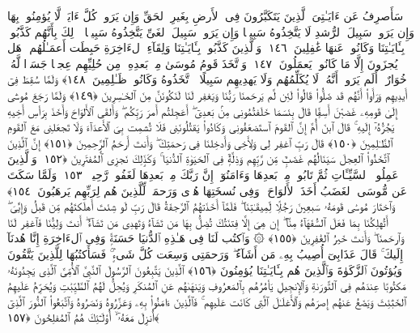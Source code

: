  سَأَصرِفُ عَن ءَايَـٰتِىَ ٱلَّذِينَ يَتَكَبَّرُونَ فِى ٱلأَرضِ بِغَيرِ ٱلحَقِّ وَإِن يَرَوا۟ كُلَّ ءَايَةٍۢ لَّا يُؤمِنُوا۟ بِهَا وَإِن يَرَوا۟ سَبِيلَ ٱلرُّشدِ لَا يَتَّخِذُوهُ سَبِيلًۭا وَإِن يَرَوا۟ سَبِيلَ ٱلغَىِّ يَتَّخِذُوهُ سَبِيلًۭا ۚ ذَٟلِكَ بِأَنَّهُم كَذَّبُوا۟ بِـَٔايَـٰتِنَا وَكَانُوا۟ عَنهَا غَٰفِلِينَ ﴿١٤٦﴾
 وَٱلَّذِينَ كَذَّبُوا۟ بِـَٔايَـٰتِنَا وَلِقَآءِ ٱلءَاخِرَةِ حَبِطَت أَعمَـٰلُهُم ۚ هَل يُجزَونَ إِلَّا مَا كَانُوا۟ يَعمَلُونَ ﴿١٤٧﴾
 وَٱتَّخَذَ قَومُ مُوسَىٰ مِنۢ بَعدِهِۦ مِن حُلِيِّهِم عِجلًۭا جَسَدًۭا لَّهُۥ خُوَارٌ ۚ أَلَم يَرَوا۟ أَنَّهُۥ لَا يُكَلِّمُهُم وَلَا يَهدِيهِم سَبِيلًا ۘ ٱتَّخَذُوهُ وَكَانُوا۟ ظَـٰلِمِينَ ﴿١٤٨﴾
 وَلَمَّا سُقِطَ فِىٓ أَيدِيهِم وَرَأَوا۟ أَنَّهُم قَد ضَلُّوا۟ قَالُوا۟ لَئِن لَّم يَرحَمنَا رَبُّنَا وَيَغفِر لَنَا لَنَكُونَنَّ مِنَ ٱلخَـٰسِرِينَ ﴿١٤٩﴾
 وَلَمَّا رَجَعَ مُوسَىٰٓ إِلَىٰ قَومِهِۦ غَضبَٰنَ أَسِفًۭا قَالَ بِئسَمَا خَلَفتُمُونِى مِنۢ بَعدِىٓ ۖ أَعَجِلتُم أَمرَ رَبِّكُم ۖ وَأَلقَى ٱلأَلوَاحَ وَأَخَذَ بِرَأسِ أَخِيهِ يَجُرُّهُۥٓ إِلَيهِ ۚ قَالَ ٱبنَ أُمَّ إِنَّ ٱلقَومَ ٱستَضعَفُونِى وَكَادُوا۟ يَقتُلُونَنِى فَلَا تُشمِت بِىَ ٱلأَعدَآءَ وَلَا تَجعَلنِى مَعَ ٱلقَومِ ٱلظَّـٰلِمِينَ ﴿١٥٠﴾
 قَالَ رَبِّ ٱغفِر لِى وَلِأَخِى وَأَدخِلنَا فِى رَحمَتِكَ ۖ وَأَنتَ أَرحَمُ ٱلرَّٟحِمِينَ ﴿١٥١﴾
 إِنَّ ٱلَّذِينَ ٱتَّخَذُوا۟ ٱلعِجلَ سَيَنَالُهُم غَضَبٌۭ مِّن رَّبِّهِم وَذِلَّةٌۭ فِى ٱلحَيَوٰةِ ٱلدُّنيَا ۚ وَكَذَٟلِكَ نَجزِى ٱلمُفتَرِينَ ﴿١٥٢﴾
 وَٱلَّذِينَ عَمِلُوا۟ ٱلسَّيِّـَٔاتِ ثُمَّ تَابُوا۟ مِنۢ بَعدِهَا وَءَامَنُوٓا۟ إِنَّ رَبَّكَ مِنۢ بَعدِهَا لَغَفُورٌۭ رَّحِيمٌۭ ﴿١٥٣﴾
 وَلَمَّا سَكَتَ عَن مُّوسَى ٱلغَضَبُ أَخَذَ ٱلأَلوَاحَ ۖ وَفِى نُسخَتِهَا هُدًۭى وَرَحمَةٌۭ لِّلَّذِينَ هُم لِرَبِّهِم يَرهَبُونَ ﴿١٥٤﴾
 وَٱختَارَ مُوسَىٰ قَومَهُۥ سَبعِينَ رَجُلًۭا لِّمِيقَـٰتِنَا ۖ فَلَمَّآ أَخَذَتهُمُ ٱلرَّجفَةُ قَالَ رَبِّ لَو شِئتَ أَهلَكتَهُم مِّن قَبلُ وَإِيَّٰىَ ۖ أَتُهلِكُنَا بِمَا فَعَلَ ٱلسُّفَهَآءُ مِنَّآ ۖ إِن هِىَ إِلَّا فِتنَتُكَ تُضِلُّ بِهَا مَن تَشَآءُ وَتَهدِى مَن تَشَآءُ ۖ أَنتَ وَلِيُّنَا فَٱغفِر لَنَا وَٱرحَمنَا ۖ وَأَنتَ خَيرُ ٱلغَٰفِرِينَ ﴿١٥٥﴾
 ۞ وَٱكتُب لَنَا فِى هَـٰذِهِ ٱلدُّنيَا حَسَنَةًۭ وَفِى ٱلءَاخِرَةِ إِنَّا هُدنَآ إِلَيكَ ۚ قَالَ عَذَابِىٓ أُصِيبُ بِهِۦ مَن أَشَآءُ ۖ وَرَحمَتِى وَسِعَت كُلَّ شَىءٍۢ ۚ فَسَأَكتُبُهَا لِلَّذِينَ يَتَّقُونَ وَيُؤتُونَ ٱلزَّكَوٰةَ وَٱلَّذِينَ هُم بِـَٔايَـٰتِنَا يُؤمِنُونَ ﴿١٥٦﴾
 ٱلَّذِينَ يَتَّبِعُونَ ٱلرَّسُولَ ٱلنَّبِىَّ ٱلأُمِّىَّ ٱلَّذِى يَجِدُونَهُۥ مَكتُوبًا عِندَهُم فِى ٱلتَّورَىٰةِ وَٱلإِنجِيلِ يَأمُرُهُم بِٱلمَعرُوفِ وَيَنهَىٰهُم عَنِ ٱلمُنكَرِ وَيُحِلُّ لَهُمُ ٱلطَّيِّبَٰتِ وَيُحَرِّمُ عَلَيهِمُ ٱلخَبَٰٓئِثَ وَيَضَعُ عَنهُم إِصرَهُم وَٱلأَغلَـٰلَ ٱلَّتِى كَانَت عَلَيهِم ۚ فَٱلَّذِينَ ءَامَنُوا۟ بِهِۦ وَعَزَّرُوهُ وَنَصَرُوهُ وَٱتَّبَعُوا۟ ٱلنُّورَ ٱلَّذِىٓ أُنزِلَ مَعَهُۥٓ ۙ أُو۟لَـٰٓئِكَ هُمُ ٱلمُفلِحُونَ ﴿١٥٧﴾
